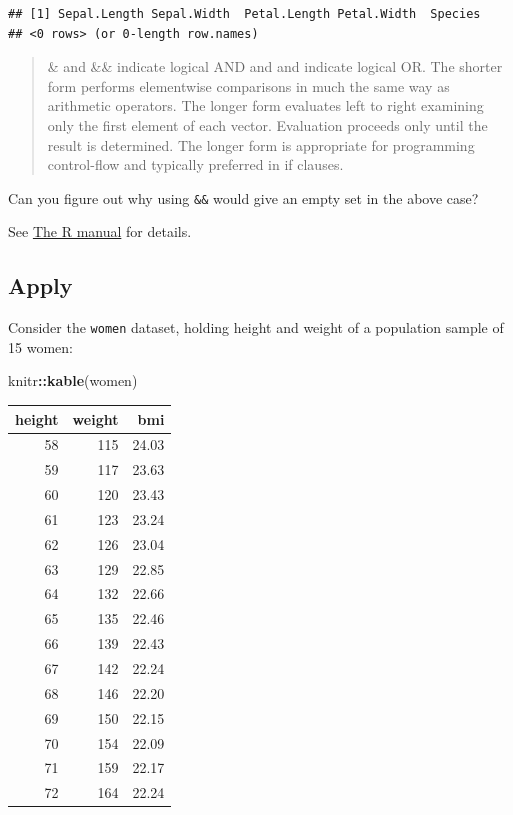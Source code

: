\documentclass[]{book}
\newenvironment{Shaded}{\begin{snugshade}}{\end{snugshade}}
\newcommand{\KeywordTok}[1]{\textcolor[rgb]{0.13,0.29,0.53}{\textbf{#1}}}
\newcommand{\NormalTok}[1]{#1}
\newcommand{\OperatorTok}[1]{\textcolor[rgb]{0.81,0.36,0.00}{\textbf{#1}}}
\begin{document}
\begin{verbatim}
## [1] Sepal.Length Sepal.Width  Petal.Length Petal.Width  Species     
## <0 rows> (or 0-length row.names)
\end{verbatim}

\begin{quote}
\& and \&\& indicate logical AND and \textbar{} and \textbar{}\textbar{} indicate logical OR. The shorter form performs elementwise comparisons in much the same way as arithmetic operators. The longer form evaluates left to right examining only the first element of each vector. Evaluation proceeds only until the result is determined. The longer form is appropriate for programming control-flow and typically preferred in if clauses.
\end{quote}

Can you figure out why using \texttt{\&\&} would give an empty set in the above case?

See \href{http://stat.ethz.ch/R-manual/R-patched/library/base/html/Logic.html}{The R manual} for details.

\hypertarget{apply}{%
\subsection{Apply}\label{apply}}

Consider the \texttt{women} dataset, holding height and weight of a population sample of 15 women:

\begin{Shaded}
\begin{Highlighting}[]
\NormalTok{knitr}\OperatorTok{::}\KeywordTok{kable}\NormalTok{(women)}
\end{Highlighting}
\end{Shaded}

\begin{tabular}{r|r|r}
\hline
height & weight & bmi\\
\hline
58 & 115 & 24.03\\
\hline
59 & 117 & 23.63\\
\hline
60 & 120 & 23.43\\
\hline
61 & 123 & 23.24\\
\hline
62 & 126 & 23.04\\
\hline
63 & 129 & 22.85\\
\hline
64 & 132 & 22.66\\
\hline
65 & 135 & 22.46\\
\hline
66 & 139 & 22.43\\
\hline
67 & 142 & 22.24\\
\hline
68 & 146 & 22.20\\
\hline
69 & 150 & 22.15\\
\hline
70 & 154 & 22.09\\
\hline
71 & 159 & 22.17\\
\hline
72 & 164 & 22.24\\
\hline
\end{tabular}
\end{document}
